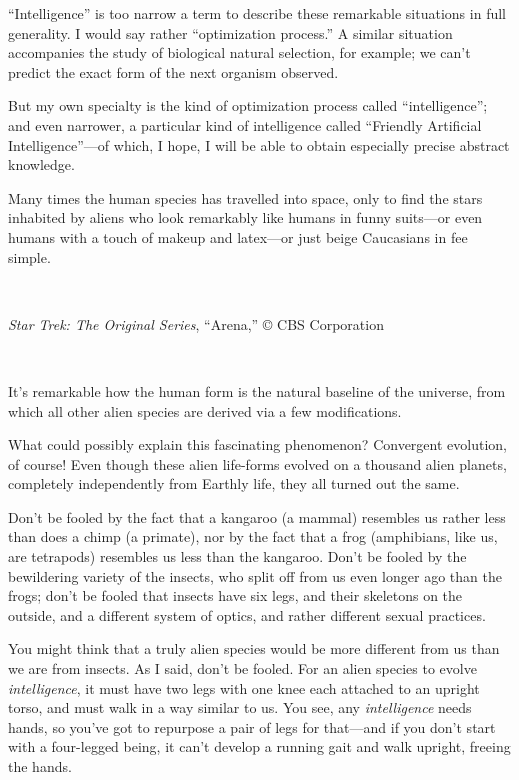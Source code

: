 {
 ``Intelligence'' is too narrow
a term to describe these remarkable situations in full generality. I
would say rather ``optimization
process.'' A similar situation accompanies the study
of biological natural selection, for example; we can't
predict the exact form of the next organism observed.}

{
 But my own specialty is the kind of optimization process called
``intelligence''; and even narrower,
a particular kind of intelligence called ``Friendly
Artificial Intelligence''---of which, I hope, I will
be able to obtain especially precise abstract knowledge.}

\myendsectiontext


{
 Many times the human species has travelled into space, only to
find the stars inhabited by aliens who look remarkably like humans in
funny suits---or even humans with a touch of makeup and latex---or just
beige Caucasians in fee simple.}

{
 ~}

{\centering
{}
 \newline
 \textit{Star Trek: The Original Series},
``Arena,'' © CBS Corporation
\par}


\bigskip

{
 ~}

{
 It's remarkable how the human form is the natural
baseline of the universe, from which all other alien species are
derived via a few modifications.}

{
 What could possibly explain this fascinating phenomenon?
Convergent evolution, of course! Even though these alien life-forms
evolved on a thousand alien planets, completely independently from
Earthly life, they all turned out the same.}

{
 Don't be fooled by the fact that a kangaroo (a
mammal) resembles us rather less than does a chimp (a primate), nor by
the fact that a frog (amphibians, like us, are tetrapods) resembles us
less than the kangaroo. Don't be fooled by the
bewildering variety of the insects, who split off from us even longer
ago than the frogs; don't be fooled that insects have
six legs, and their skeletons on the outside, and a different system of
optics, and rather different sexual practices.}

{
 You might think that a truly alien species would be more different
from us than we are from insects. As I said, don't be
fooled. For an alien species to evolve \textit{intelligence}, it must
have two legs with one knee each attached to an upright torso, and must
walk in a way similar to us. You see, any \textit{intelligence} needs
hands, so you've got to repurpose a pair of legs for
that---and if you don't start with a four-legged being,
it can't develop a running gait and walk upright,
freeing the hands.}

